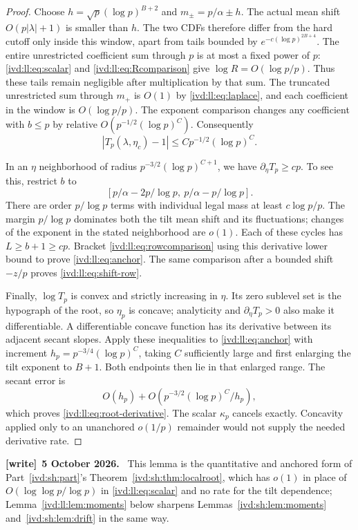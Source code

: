 \documentclass[11pt,letterpaper]{article}
\theoremstyle{remark}\newtheorem{remark}[theorem]{Remark}
\numberwithin{equation}{section}
\newenvironment{writenote}[1][]{\par\smallskip\begingroup\small
 \noindent\textbf{[write]}\if\relax\detokenize{#1}\relax\else~\textbf{#1.}\fi\ }%
 {\par\endgroup\smallskip}
\begin{document}
\begin{proof}
Choose $h=\sqrt p(\log p)^{B+2}$ and $m_\pm=p/\alpha\pm h$.
The actual mean shift $O(p|\lambda|+1)$ is smaller than $h$.
The two CDFs therefore differ from the hard cutoff only inside this
window, apart from tails bounded by $e^{-c(\log p)^{2B+4}}$.
The entire unrestricted coefficient sum through $p$ is at most a
fixed power of $p$: \eqref{ivd:ll:eq:scalar} and \eqref{ivd:ll:eq:Rcomparison}
give $\log R=O(\log p/p)$. Thus these tails remain negligible after
multiplication by that sum. The truncated unrestricted sum through
$m_+$ is $O(1)$ by \eqref{ivd:ll:eq:laplace}, and each coefficient in the
window is $O(\log p/p)$. The exponent comparison changes any
coefficient with $b\le p$ by relative
$O(p^{-1/2}(\log p)^C)$. Consequently
\begin{equation}\label{ivd:ll:eq:rowcomparison}
 |T_p(\lambda,\eta_c)-1|\le Cp^{-1/2}(\log p)^C.
\end{equation}

In an $\eta$ neighborhood of radius $p^{-3/2}(\log p)^{C+1}$,
we have $\partial_\eta T_p\ge cp$. To see this, restrict $b$ to
\begin{equation}\label{ivd:ll:eq:active-b}
 [p/\alpha-2p/\log p,\ p/\alpha-p/\log p].
\end{equation}
There are order $p/\log p$ terms with individual legal mass at
least $c\log p/p$. The margin $p/\log p$ dominates both the tilt
mean shift and its fluctuations; changes of the exponent in the
stated neighborhood are $o(1)$. Each of these cycles has
$L\ge b+1\ge cp$. Bracket \eqref{ivd:ll:eq:rowcomparison} using this
derivative lower bound to prove \eqref{ivd:ll:eq:anchor}. The same comparison
after a bounded shift $-z/p$ proves \eqref{ivd:ll:eq:shift-row}.

Finally, $\log T_p$ is convex and strictly increasing in $\eta$.
Its zero sublevel set is the hypograph of the root, so
$\eta_p$ is concave; analyticity and $\partial_\eta T_p>0$ also
make it differentiable. A differentiable concave function has its
derivative between its adjacent secant slopes. Apply these inequalities
to \eqref{ivd:ll:eq:anchor} with increment
$h_p=p^{-3/4}(\log p)^C$, taking $C$ sufficiently large and first
enlarging the tilt exponent to $B+1$. Both endpoints then lie in
that enlarged range. The secant error is
\[
 O(h_p)+O(p^{-3/2}(\log p)^C/h_p),
\]
which proves \eqref{ivd:ll:eq:root-derivative}. The scalar $\kappa_p$
cancels exactly. Concavity applied only to an unanchored $o(1/p)$
remainder would not supply the needed derivative rate.
\end{proof}
\begin{writenote}[5 October 2026]
This lemma is the quantitative and anchored form of Part~\ref{ivd:sh:part}'s Theorem~\ref{ivd:sh:thm:localroot}, which has $o(1)$ in place of $O(\log\log p/\log p)$ in \eqref{ivd:ll:eq:scalar} and no rate for the tilt dependence; Lemma~\ref{ivd:ll:lem:moments} below sharpens Lemmas~\ref{ivd:sh:lem:moments} and~\ref{ivd:sh:lem:drift} in the same way.
\end{writenote}
\end{document}
